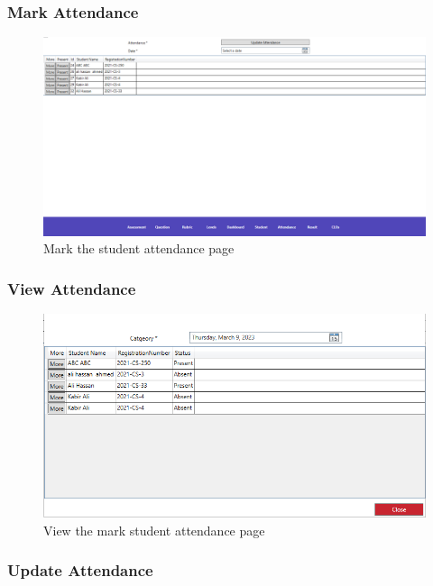 \documentclass[12pt,a4paper]{article}
\begin{document}
\subsubsection{Mark Attendance}
\begin{figure}[H]
  \centering
  \includegraphics[scale=0.5]{GUIAddAttendance}
  
  \caption{Mark the student attendance page}
\end{figure}


\subsubsection{View Attendance}
\begin{figure}[H]
  \centering
  \includegraphics[scale=0.8]{GUIUpdateAttendance}

  \caption{View the mark student attendance page}
\end{figure}


\subsubsection{Update Attendance}
\end{document}
